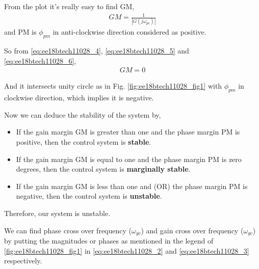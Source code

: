 \begin{enumerate}[label=\thesection.\arabic*.,ref=\thesection.\theenumi]
From the plot it's really easy to find GM,
\begin{align}
    GM = \frac{1}{|G(j\omega_{pc})|}
    \label{eq:ee18btech11028_6}
\end{align}
and PM is $\phi_{pm}$ in anti-clockwise direction considered as positive.

So from \eqref{eq:ee18btech11028_4}, \eqref{eq:ee18btech11028_5} and \eqref{eq:ee18btech11028_6},
\begin{align}
    GM = 0
\end{align}

And it intersects unity circle as in Fig. \ref{fig:ee18btech11028_fig1} with $\phi_{pm}$ in clockwise direction, which implies it is negative.

Now we can deduce the stability of the system by,
\begin{itemize}
    \item If the gain margin GM is greater than one and the phase margin PM is positive, then the control system is \textbf{stable}.
    \item If the gain margin GM is equal to one and the phase margin PM is zero degrees, then the control system is  \textbf{marginally stable}.
    \item If the gain margin GM is less than one and (OR) the phase margin PM is negative, then the control system is \textbf{unstable}.
\end{itemize}

Therefore, our system is unstable.

We can find phase cross over frequency ($\omega_{gc}$) and gain cross over frequency ($\omega_{gc}$) by putting the magnitudes or phases as mentioned in the legend of \ref{fig:ee18btech11028_fig1} in \eqref{eq:ee18btech11028_2}
and \eqref{eq:ee18btech11028_3} respectively.


\end{enumerate}
